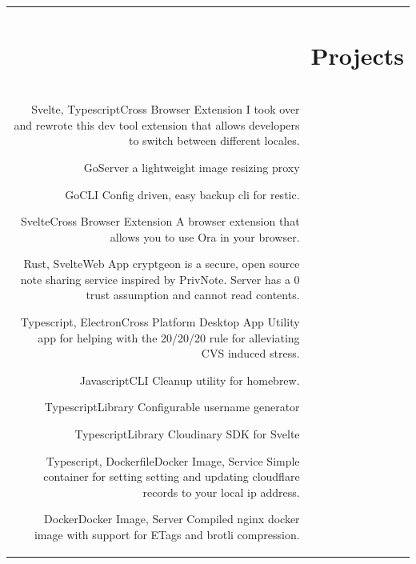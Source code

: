 \documentclass[letterpaper,11pt]{article}
\newcommand{\headingfont}{\Large\color{accent}\BluuNext}
\newenvironment{SectionTable}[1]{
	\renewcommand*{\arraystretch}{1.7}
	\setlength{\tabcolsep}{10pt}
	\begin{longtable}{Rp{5.2in}} & #1 \\}
{\end{longtable}\vspace{-.3cm}}
\begin{document}
\begin{SectionTable}{\headingfont \section{Projects}}

  {Svelte, Typescript}{Cross Browser Extension}
  {
    I took over and rewrote this dev tool extension that allows developers to switch between different locales.
  }

  {Go}{Server}
  {
    a lightweight image resizing proxy
  }

  {Go}{CLI}
  {
    Config driven, easy backup cli for restic.
  }

  {Svelte}{Cross Browser Extension}
  {
    A browser extension that allows you to use Ora in your browser.
  }

  {Rust, Svelte}{Web App}{
    cryptgeon is a secure, open source note sharing service inspired by PrivNote. Server has a 0 trust assumption and cannot read contents.
  }

  {Typescript, Electron}{Cross Platform Desktop App}{
    Utility app for helping with the 20/20/20 rule for alleviating CVS induced stress.
  }

  {Javascript}{CLI}{
    Cleanup utility for homebrew.
  }

  {Typescript}{Library}{
    Configurable username generator
  }

  {Typescript}{Library}{
    Cloudinary SDK for Svelte
  }

  {Typescript, Dockerfile}{Docker Image, Service}{
    Simple container for setting setting and updating cloudflare records to your local ip address.
  }

  {Docker}{Docker Image, Server}{
    Compiled nginx docker image with support for ETags and brotli compression.
  }


\end{SectionTable}
\end{document}
